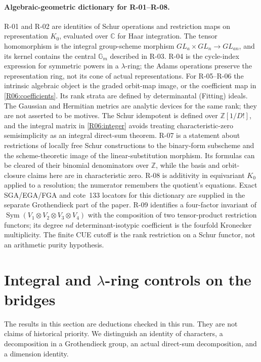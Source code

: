 \documentclass[11pt,a4paper]{article}
\theoremstyle{definition}\newtheorem{definition}{Definition}
\begin{document}
\paragraph{Algebraic-geometric dictionary for R-01--R-08.}
R-01 and R-02 are identities of Schur operations and restriction maps
on representation $K_0$, evaluated over $\mathbb C$ for Haar integration.
The tensor homomorphism is the integral group-scheme morphism
$GL_a\times GL_n\to GL_{an}$, and its kernel contains the central
$\mathbb G_m$ described in R-03. R-04 is the cycle-index expression
for symmetric powers in a $\lambda$-ring; the Adams operations preserve
the representation ring, not its cone of actual representations.
For R-05--R-06 the intrinsic algebraic object is the graded orbit-map
image, or the coefficient map in \eqref{R06:coefficients}. Its rank
strata are defined by determinantal (Fitting) ideals. The Gaussian
and Hermitian metrics are analytic devices for the same rank; they
are not asserted to be motives. The Schur idempotent is defined over
$\mathbb Z[1/D!]$, and the integral matrix in \eqref{R06:integer}
avoids treating characteristic-zero semisimplicity as an integral
direct-sum theorem. R-07 is a statement about restrictions of locally
free Schur constructions to the binary-form subscheme and the
scheme-theoretic image of the linear-substitution morphism. Its
formulas can be cleared of their binomial denominators over
$\mathbb Z$, while the basis and orbit-closure claims here are in
characteristic zero. R-08 is additivity in equivariant $K_0$ applied
to a resolution; the numerator remembers the quotient's equations.
Exact SGA/EGA/FGA and cote~133 locators for this dictionary are supplied
in the separate Grothendieck part of the paper.
R-09 identifies a four-factor invariant of
$\operatorname{Sym}(V_1\otimes V_2\otimes V_3\otimes V_4)$ with the
composition of two tensor-product restriction functors; its degree
$nd$ determinant-isotypic coefficient is the fourfold Kronecker
multiplicity. The finite CUE cutoff is the rank restriction on a
Schur functor, not an arithmetic purity hypothesis.


\section{Integral and $\lambda$-ring controls on the bridges}\label{sec:root-findings}
The results in this section are deductions checked in this run. They are not claims of historical priority. We distinguish an identity of characters, a decomposition in a Grothendieck group, an actual direct-sum decomposition, and a dimension identity.
\end{document}
